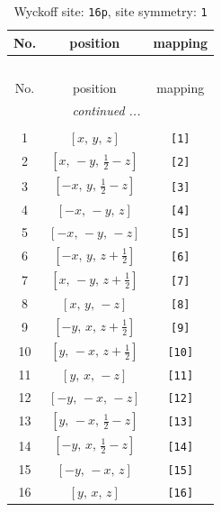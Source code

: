 \documentclass[fleqn,8pt]{jsarticle}
\begin{document}
\begin{longtable}{ccc}
\caption{Wyckoff site: {\tt 16p}, site symmetry: {\tt 1}}
 \\
 \hline \hline
No. & position & mapping \\ \hline \endfirsthead

\multicolumn{2}{l}{\tablename\ \thetable{}} \\
 \hline \hline
No. & position & mapping \\ \hline \endhead

 \hline \hline
\multicolumn{2}{r}{\footnotesize\it continued ...} \\ \endfoot

 \hline \hline
\multicolumn{2}{r}{} \\ \endlastfoot

1 & $\left[ x,\, y,\, z \right]$ & {\tt [1]} \\ \hline
2 & $\left[ x,\, - y,\, \frac{1}{2} - z \right]$ & {\tt [2]} \\ \hline
3 & $\left[ - x,\, y,\, \frac{1}{2} - z \right]$ & {\tt [3]} \\ \hline
4 & $\left[ - x,\, - y,\, z \right]$ & {\tt [4]} \\ \hline
5 & $\left[ - x,\, - y,\, - z \right]$ & {\tt [5]} \\ \hline
6 & $\left[ - x,\, y,\, z + \frac{1}{2} \right]$ & {\tt [6]} \\ \hline
7 & $\left[ x,\, - y,\, z + \frac{1}{2} \right]$ & {\tt [7]} \\ \hline
8 & $\left[ x,\, y,\, - z \right]$ & {\tt [8]} \\ \hline
9 & $\left[ - y,\, x,\, z + \frac{1}{2} \right]$ & {\tt [9]} \\ \hline
10 & $\left[ y,\, - x,\, z + \frac{1}{2} \right]$ & {\tt [10]} \\ \hline
11 & $\left[ y,\, x,\, - z \right]$ & {\tt [11]} \\ \hline
12 & $\left[ - y,\, - x,\, - z \right]$ & {\tt [12]} \\ \hline
13 & $\left[ y,\, - x,\, \frac{1}{2} - z \right]$ & {\tt [13]} \\ \hline
14 & $\left[ - y,\, x,\, \frac{1}{2} - z \right]$ & {\tt [14]} \\ \hline
15 & $\left[ - y,\, - x,\, z \right]$ & {\tt [15]} \\ \hline
16 & $\left[ y,\, x,\, z \right]$ & {\tt [16]} \\
\end{longtable}
\end{document}
